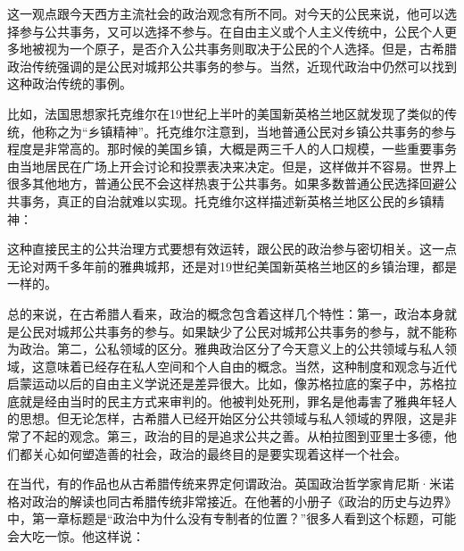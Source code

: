 这一观点跟今天西方主流社会的政治观念有所不同。对今天的公民来说，他可以选择参与公共事务，又可以选择不参与。在自由主义或个人主义传统中，公民个人更多地被视为一个原子，是否介入公共事务则取决于公民的个人选择。但是，古希腊政治传统强调的是公民对城邦公共事务的参与。当然，近现代政治中仍然可以找到这种政治传统的事例。

比如，法国思想家托克维尔在19世纪上半叶的美国新英格兰地区就发现了类似的传统，他称之为“乡镇精神”。托克维尔注意到，当地普通公民对乡镇公共事务的参与程度是非常高的。那时候的美国乡镇，大概是两三千人的人口规模，一些重要事务由当地居民在广场上开会讨论和投票表决来决定。但是，这样做并不容易。世界上很多其他地方，普通公民不会这样热衷于公共事务。如果多数普通公民选择回避公共事务，真正的自治就难以实现。托克维尔这样描述新英格兰地区公民的乡镇精神：


这种直接民主的公共治理方式要想有效运转，跟公民的政治参与密切相关。这一点无论对两千多年前的雅典城邦，还是对19世纪美国新英格兰地区的乡镇治理，都是一样的。

总的来说，在古希腊人看来，政治的概念包含着这样几个特性：第一，政治本身就是公民对城邦公共事务的参与。如果缺少了公民对城邦公共事务的参与，就不能称为政治。第二，公私领域的区分。雅典政治区分了今天意义上的公共领域与私人领域，这意味着已经存在私人空间和个人自由的概念。当然，这种制度和观念与近代启蒙运动以后的自由主义学说还是差异很大。比如，像苏格拉底的案子中，苏格拉底就是经由当时的民主方式来审判的。他被判处死刑，罪名是他毒害了雅典年轻人的思想。但无论怎样，古希腊人已经开始区分公共领域与私人领域的界限，这是非常了不起的观念。第三，政治的目的是追求公共之善。从柏拉图到亚里士多德，他们都关心如何塑造善的社会，政治的最终目的是要实现着这样一个社会。

在当代，有的作品也从古希腊传统来界定何谓政治。英国政治哲学家肯尼斯·米诺格对政治的解读也同古希腊传统非常接近。在他著的小册子《政治的历史与边界》中，第一章标题是“政治中为什么没有专制者的位置？”很多人看到这个标题，可能会大吃一惊。他这样说：


